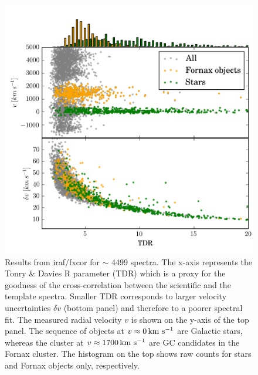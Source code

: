 \begin{figure}
\centering
\includegraphics[width=\columnwidth]{figures/fxcor_subplot.png} 
\caption{Results from iraf/fxcor for $\sim$ 4499 spectra. The x-axis represents 
the Tonry \& Davies R parameter (TDR) which is a proxy for the goodness of the 
cross-correlation between the scientific and the template spectra. Smaller TDR 
corresponds to larger velocity uncertainties $\delta v$ (bottom panel) and 
therefore to a poorer spectral fit. The measured radial velocity $v$ is shown 
on the y-axis of the top panel. The sequence of objects at $v\approx 0 \mbox{\,km~s$^{-1}$}$ 
are Galactic stars, whereas the cluster at $v\approx1700\mbox{\,km~s$^{-1}$}$ are GC candidates 
in the Fornax cluster. The histogram on the top shows raw counts for stars and 
Fornax objects only, respectively. }
\label{fig:tdr}
\end{figure}

